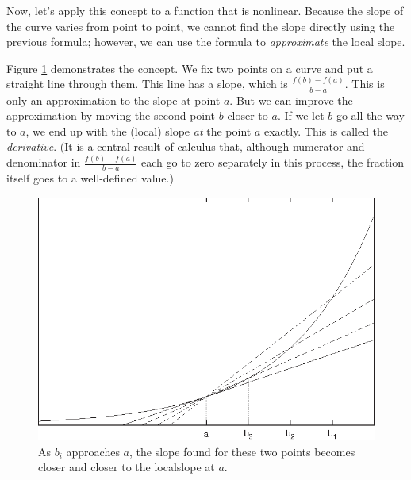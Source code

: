 Now, let's apply this concept to a function that is nonlinear.
Because the slope of the curve varies from point to point, we cannot
find the slope directly using the previous formula; however, we can
use the formula to \emph{approximate} the local slope.

Figure \ref{fig:derivative} demonstrates the concept. We fix two
points on a curve and put a straight line through them. This line has
a slope, which is $\frac{f(b) - f(a)}{b - a}$. This is only an
approximation to the slope at point $a$.  But we can improve the
approximation by moving the second point $b$ closer to $a$. If we let
$b$ go all the way to $a$, we end up with the (local) slope \emph{at}
the point $a$ exactly. This is called the \emph{derivative}.  (It is a
central result of calculus that, although numerator and denominator in
$\frac{f(b) - f(a)}{b - a}$ each go to zero separately in this
process, the fraction itself goes to a well-defined value.)

\begin{figure}
  \centerline{\includegraphics{img/derivative}}
  \caption{As $b_i$ approaches $a$, the slope found for these two
    points becomes closer and closer to the local\hfill\break slope at $a$.}
  \label{fig:derivative}\vspace*{-9pt}
\end{figure}

